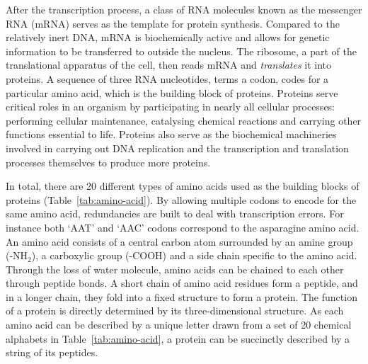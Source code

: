 After the transcription process, a class of RNA molecules known as the messenger RNA (mRNA) serves as the template for protein synthesis. Compared to the relatively inert DNA, mRNA is biochemically active and allows for genetic information to be transferred to outside the nucleus. The ribosome, a part of the translational apparatus of the cell, then reads mRNA and \emph{translates} it into proteins. A sequence of three RNA nucleotides, terms a codon, codes for a particular amino acid, which is the building block of proteins. Proteins serve critical roles in an organism by participating in nearly all cellular processes: performing cellular maintenance, catalysing chemical reactions and carrying other functions essential to life. Proteins also serve as the biochemical machineries involved in carrying out DNA replication and the transcription and translation processes themselves to produce more proteins. 

In total, there are 20 different types of amino acids used as the building blocks of proteins (Table~\ref{tab:amino-acid}). By allowing multiple codons to encode for the same amino acid, redundancies are built to deal with transcription errors. For instance both `AAT' and `AAC' codons correspond to the asparagine amino acid. An amino acid consists of a central carbon atom surrounded by an amine group (-NH$_2$), a carboxylic group (-COOH) and a side chain specific to the amino acid. Through the loss of water molecule, amino acids can be chained to each other through peptide bonds. A short chain of amino acid residues form a peptide, and in a longer chain, they fold into a fixed structure to form a protein. The function of a protein is directly determined by its three-dimensional structure. As each amino acid can be described by a unique letter drawn from a set of 20 chemical alphabets in Table~\ref{tab:amino-acid}, a protein can be succinctly described by a string of its peptides. 

